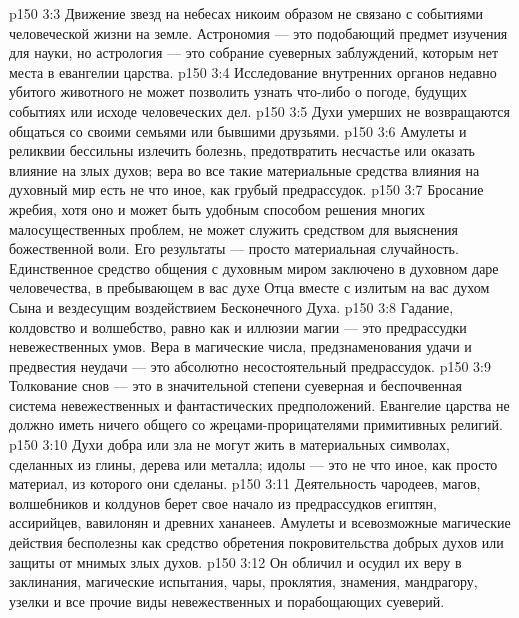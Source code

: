\vs p150 3:3 \bibnobreakspace Движение звезд на небесах никоим образом не связано с событиями человеческой жизни на земле. Астрономия --- это подобающий предмет изучения для науки, но астрология --- это собрание суеверных заблуждений, которым нет места в евангелии царства.
\vs p150 3:4 \pc {}\bibnobreakspace Исследование внутренних органов недавно убитого животного не может позволить узнать что\hyp{}либо о погоде, будущих событиях или исходе человеческих дел.
\vs p150 3:5 \pc {}\bibnobreakspace Духи умерших не возвращаются общаться со своими семьями или бывшими друзьями.
\vs p150 3:6 \pc {}\bibnobreakspace Амулеты и реликвии бессильны излечить болезнь, предотвратить несчастье или оказать влияние на злых духов; вера во все такие материальные средства влияния на духовный мир есть не что иное, как грубый предрассудок.
\vs p150 3:7 \pc {}\bibnobreakspace Бросание жребия, хотя оно и может быть удобным способом решения многих малосущественных проблем, не может служить средством для выяснения божественной воли. Его результаты --- просто материальная случайность. Единственное средство общения с духовным миром заключено в духовном даре человечества, в пребывающем в вас духе Отца вместе с излитым на вас духом Сына и вездесущим воздействием Бесконечного Духа.
\vs p150 3:8 \pc {}\bibnobreakspace Гадание, колдовство и волшебство, равно как и иллюзии магии --- это предрассудки невежественных умов. Вера в магические числа, предзнаменования удачи и предвестия неудачи --- это абсолютно несостоятельный предрассудок.
\vs p150 3:9 \pc {}\bibnobreakspace Толкование снов --- это в значительной степени суеверная и беспочвенная система невежественных и фантастических предположений. Евангелие царства не должно иметь ничего общего со жрецами\hyp{}прорицателями примитивных религий.
\vs p150 3:10 \pc {}\bibnobreakspace Духи добра или зла не могут жить в материальных символах, сделанных из глины, дерева или металла; идолы --- это не что иное, как просто материал, из которого они сделаны.
\vs p150 3:11 \pc {}\bibnobreakspace Деятельность чародеев, магов, волшебников и колдунов берет свое начало из предрассудков египтян, ассирийцев, вавилонян и древних хананеев. Амулеты и всевозможные магические действия бесполезны как средство обретения покровительства добрых духов или защиты от мнимых злых духов.
\vs p150 3:12 \pc {}\bibnobreakspace Он обличил и осудил их веру в заклинания, магические испытания, чары, проклятия, знамения, мандрагору, узелки и все прочие виды невежественных и порабощающих суеверий.
